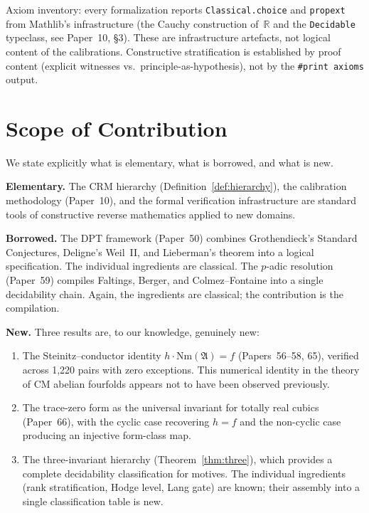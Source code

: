 \documentclass[11pt]{article}
\theoremstyle{plain}
\theoremstyle{definition}
\theoremstyle{remark}
\newcommand{\R}{\mathbb{R}}
\newcommand{\fA}{\mathfrak{A}}
\newcommand{\Nm}{\mathrm{Nm}}
\begin{document}
\noindent
Axiom inventory: every formalization reports
\texttt{Classical.choice} and \texttt{propext} from
Mathlib's infrastructure (the Cauchy construction of~$\R$ and
the \texttt{Decidable} typeclass, see Paper~10, \S3).  These are
infrastructure artefacts, not logical content of the calibrations.
Constructive stratification is established by proof content
(explicit witnesses vs.\ principle-as-hypothesis), not by the
\texttt{\#print axioms} output.


\section{Scope of Contribution}\label{sec:scope}

We state explicitly what is elementary, what is borrowed, and
what is new.

\textbf{Elementary.}  The CRM hierarchy (Definition~\ref{def:hierarchy}),
the calibration methodology (Paper~10), and the formal verification
infrastructure are standard tools of constructive reverse
mathematics applied to new domains.

\textbf{Borrowed.}  The DPT framework (Paper~50) combines
Grothendieck's Standard Conjectures, Deligne's Weil~II, and
Lieberman's theorem into a logical specification.  The individual
ingredients are classical.  The $p$-adic resolution
(Paper~59) compiles Faltings, Berger, and Colmez--Fontaine
into a single decidability chain.  Again, the ingredients are
classical; the contribution is the compilation.

\textbf{New.}  Three results are, to our knowledge, genuinely new:
\begin{enumerate}
\item The Steinitz--conductor identity $h \cdot \Nm(\fA) = f$
  (Papers~56--58, 65), verified across 1{,}220 pairs with zero
  exceptions.  This numerical identity in the theory of CM
  abelian fourfolds appears not to have been observed previously.
\item The trace-zero form as the universal invariant for totally
  real cubics (Paper~66), with the cyclic case recovering $h = f$
  and the non-cyclic case producing an injective form-class map.
\item The three-invariant hierarchy
  (Theorem~\ref{thm:three}), which provides a complete
  decidability classification for motives.  The individual
  ingredients (rank stratification, Hodge level, Lang gate)
  are known; their assembly into a single classification table
  is new.
\end{enumerate}
\end{document}
